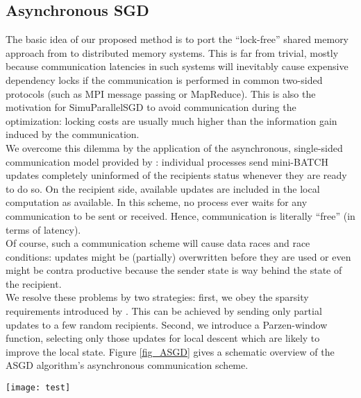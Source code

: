 \documentclass{acm_proc_article-sp}
\begin{document}
\subsection{Asynchronous SGD}\label{sec_ASGD_concept}
The basic idea of our proposed method is to port the ``lock-free'' shared memory approach from 
\cite{recht2011hogwild} to distributed memory systems. This is far from trivial,
mostly because communication latencies in such systems will inevitably cause 
expensive dependency locks if the communication is performed in common two-sided
protocols (such as MPI message passing or MapReduce). This is also the
motivation for SimuParallelSGD \cite{SGDsmola} to avoid communication
 during the optimization: locking costs are usually much higher than the information
gain induced by the communication.\\
We overcome this dilemma by the application of the asynchronous, single-sided 
communication model provided by \cite{grunewald2013gaspi}: individual processes
send mini-BATCH \cite{sculley2010web} updates completely uninformed 
of the recipients status whenever they are ready to do so. On the recipient 
side, available updates are included in the local computation as available. 
In this scheme, no process ever waits for any communication to be sent or 
received. Hence, communication is literally ``free'' (in terms of latency).\\
Of course, such a communication scheme will cause data races and race conditions: 
updates might  be (partially) overwritten before they are used or even might be 
contra productive because the sender state is way behind the state of the recipient.\\
We resolve these problems by two strategies: first, we obey 
the sparsity requirements introduced by \cite{recht2011hogwild}.
This can be 
achieved by sending only partial updates to a few random recipients. Second,
we introduce a Parzen-window function, selecting only those updates
for local descent which are likely to improve the local state.          
Figure \ref{fig_ASGD} gives a schematic overview of the ASGD algorithm's 
asynchronous communication scheme.
\begin{figure*}
\centering
\texttt{[image: test]}
\caption{Overview of the asynchronous update communication used in ASGD.
Given a cluster environment of $R$ nodes with $H$ threads each, the blue markers 
indicate different stages and scenarios of the communication mode. {\bf I:} Thread 
$3$ of node $1$ finished the computation of of its local  mini-batch update. 
The external buffer is empty. Hence it executes the update locally and sends
the resulting state to a few random recipients.
{\bf II:} Thread $1$ of node $2$ receives an update. When its local mini-batch update
is ready, it will use the external buffer to correct its local update and then
follow I.
{\bf III:} Shows a potential data race: two external updates might overlap
in the external buffer of thread $H-1$ of node $2$. Resolving
data races is discussed in section \ref{sec_race}.
\label{fig_ASGD}
} 
\end{figure*}
\end{document}
